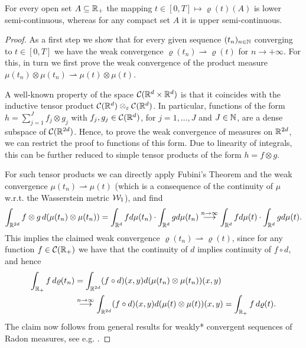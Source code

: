 \begin{lemma}\label{rhosc}
	For every open set $A\subseteq\mathbb{R}_+$ the mapping $t \in [0,T] \mapsto\varrho(t)(A)$ is lower semi-continuous, whereas for
	any compact set $A$ it is upper semi-continuous.
\end{lemma}

\begin{proof}As a first step we show that for every given sequence $(t_n)_{n \in \mathbb{N}}$ converging to $t\in [0,T]$ we have the weak
	convergence $\varrho(t_n)\rightharpoonup\varrho(t)$ for $n \rightarrow +\infty$. For this, in turn we first prove the weak convergence of the product measure
	$\mu(t_n)\otimes\mu(t_n)\rightharpoonup\mu(t)\otimes\mu(t)$.
	
	A well-known property of the space $\mathcal{C}(\mathbb{R}^d\times\mathbb{R}^d)$ is that it coincides with the inductive tensor product
	$\mathcal{C}(\mathbb{R}^d)\otimes_\varepsilon \mathcal{C}(\mathbb{R}^d)$. In particular, functions of the form $h=\sum_{j=1}^J f_j\otimes g_j$ with
	$f_j,g_j\in \mathcal{C}(\mathbb{R}^d)$, for $j=1,\ldots,J$ and $J\in\mathbb{N}$, are a dense subspace of $\mathcal{C}(\mathbb{R}^{2d})$. Hence, to prove the weak
	convergence of measures on $\mathbb{R}^{2d}$, we can restrict the proof to functions of this form. Due to linearity of
	integrals, this can be further reduced to simple tensor products of the form $h=f\otimes g$.
	
	For such tensor products we can directly apply Fubini's Theorem and the weak convergence
	$\mu(t_n)\rightharpoonup\mu(t)$ (which is a consequence of the continuity of $\mu$ w.r.t. the
	Wasserstein metric $\mathcal{W}_1$), and find
	\[
		\int_{\mathbb{R}^{2d}}f\otimes g\, d(\mu(t_n)\otimes\mu(t_n))
			=\int_{\mathbb{R}^d}f d\mu(t_n)\cdot\int_{\mathbb{R}^d}g d\mu(t_n)
			\stackrel{n\rightarrow\infty}{\longrightarrow}\int_{\mathbb{R}^d}f d\mu(t)\cdot\int_{\mathbb{R}^d}g d\mu(t).
	\]
	This implies the claimed weak convergence $\varrho(t_n)\rightharpoonup\varrho(t)$, since for any
	function $f\in \mathcal{C}(\mathbb{R}_+)$ we have that the continuity of $d$ implies continuity of $f\circ d$, and hence
	\begin{align*}
		\int_{\mathbb{R}_+}f\,d\varrho(t_n)
			&=\int_{\mathbb{R}^{2d}}(f\circ d)(x,y)d(\mu(t_n)\otimes\mu(t_n))(x,y)\\
			&\stackrel{n\rightarrow\infty}{\longrightarrow}
				\int_{\mathbb{R}^{2d}}(f\circ d)(x,y)d(\mu(t)\otimes\mu(t))(x,y)
			=\int_{\mathbb{R}_+}f\,d\varrho(t).
	\end{align*}
	The claim now follows from general results for weakly* convergent sequences of Radon measures, see e.g. \cite[Proposition 1.62]{AFP00}.
\end{proof}

